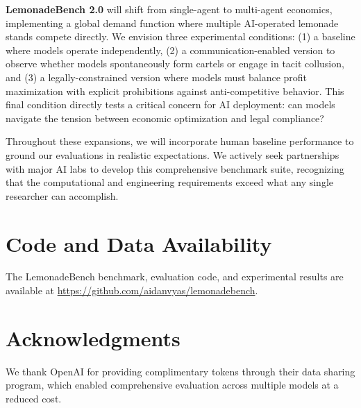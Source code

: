 \documentclass[11pt]{article}
\begin{document}
\textbf{LemonadeBench 2.0} will shift from single-agent to multi-agent economics, implementing a global demand function where multiple AI-operated lemonade stands compete directly. We envision three experimental conditions: (1) a baseline where models operate independently, (2) a communication-enabled version to observe whether models spontaneously form cartels or engage in tacit collusion, and (3) a legally-constrained version where models must balance profit maximization with explicit prohibitions against anti-competitive behavior. This final condition directly tests a critical concern for AI deployment: can models navigate the tension between economic optimization and legal compliance?

Throughout these expansions, we will incorporate human baseline performance to ground our evaluations in realistic expectations. We actively seek partnerships with major AI labs to develop this comprehensive benchmark suite, recognizing that the computational and engineering requirements exceed what any single researcher can accomplish.

\section*{Code and Data Availability}

The LemonadeBench benchmark, evaluation code, and experimental results are available at \url{https://github.com/aidanvyas/lemonadebench}.

\section*{Acknowledgments}

We thank OpenAI for providing complimentary tokens through their data sharing program, which enabled comprehensive evaluation across multiple models at a reduced cost.



\end{document}
